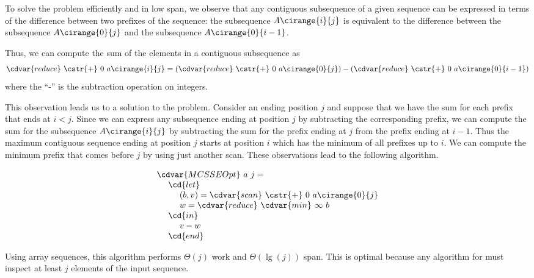 \begin{cluster}
\label{grp:alg:mcss::reduction:mcsse}

\begin{algorithm}
\label{alg:mcss::reduction:mcsse}
To solve the \MCSSE{} problem efficiently and in low span, we observe
that any contiguous subsequence of a given sequence can be expressed
in terms of the difference between two prefixes of the sequence:
the subsequence $A\cirange{i}{j}$ is equivalent to the difference
between the subsequence $A\cirange{0}{j}$ and the subsequence
$A\cirange{0}{i-1}$.

Thus, we can compute the sum of the elements in
a contiguous subsequence as
\[
\cdvar{reduce}~\cstr{+}~0~a\cirange{i}{j}
= 
\left(\cdvar{reduce}~\cstr{+}~0~a\cirange{0}{j}\right)
- 
\left(\cdvar{reduce}~\cstr{+}~0~a\cirange{0}{i-1}\right)
\]
where the ``-'' is the subtraction operation on integers.

This observation leads us to a solution to the \MCSSE{} problem.
Consider an ending position $j$ and suppose that we have
the sum for each prefix that ends at $i < j$.
Since we can express any subsequence ending at position $j$ by
subtracting the corresponding prefix, we can compute the sum for the
subsequence $A\cirange{i}{j}$ by subtracting the sum for the prefix
ending at $j$ from the prefix ending at $i-1$.
Thus the maximum contiguous sequence ending at position $j$ starts at
position $i$ which has the minimum of all prefixes up to $i$.
We can compute the minimum prefix that comes before $j$ by using just
another scan.  
These observations lead to the following algorithm.

\[
\begin{array}{l}
\cdvar{MCSSEOpt}~a~j=
\\
~~~~\cd{let}
\\
~~~~~~~~(b,v) = \cdvar{scan}~\cstr{+}~0~a\cirange{0}{j}
\\
~~~~~~~~w= \cdvar{reduce}~\cdvar{min}~\infty~b
\\
~~~~\cd{in}
\\
~~~~~~~~v - w 
\\
~~~~\cd{end}
\end{array}
\]

Using array sequences, this algorithm performs $\Theta(j)$ work and
$\Theta(\lg (j))$ span.  This is optimal because any algorithm for \MCSSE{} must inspect at least $j$ elements of the input sequence.  

\end{algorithm}
\end{cluster}


